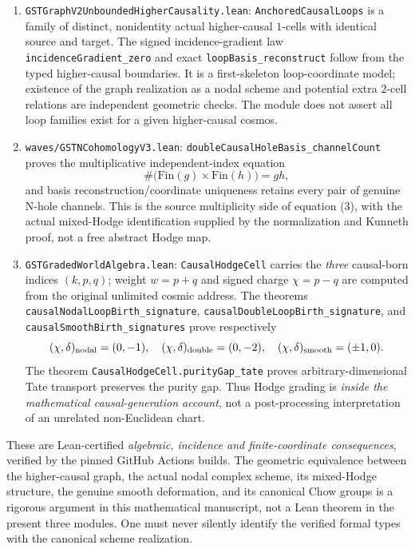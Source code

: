 \documentclass[11pt]{article}
\begin{document}
\begin{enumerate}
\item \texttt{GSTGraphV2UnboundedHigherCausality.lean}:
\texttt{AnchoredCausalLoops} is a family of distinct, nonidentity
actual higher-causal $1$-cells with identical source and target.
The signed incidence-gradient law
\texttt{incidenceGradient\_zero} and exact
\texttt{loopBasis\_reconstruct} follow from the typed
higher-causal boundaries. It is a first-skeleton loop-coordinate
model; existence of the graph realization as a nodal scheme and
potential extra $2$-cell relations are independent geometric
checks. The module does not assert all loop families exist
for a given higher-causal cosmos.

\item \texttt{waves/GSTNCohomologyV3.lean}:
\texttt{doubleCausalHoleBasis\_channelCount} proves the
multiplicative independent-index equation
\[
\#\bigl(\mathrm{Fin}(g)\times\mathrm{Fin}(h)\bigr)=gh,
\]
and basis reconstruction/coordinate uniqueness retains every
pair of genuine N-hole channels. This is the source multiplicity
side of equation (3), with the actual mixed-Hodge identification
supplied by the normalization and Kunneth proof, not a free
abstract Hodge map.

\item \texttt{GSTGradedWorldAlgebra.lean}:
\texttt{CausalHodgeCell} carries the \emph{three} causal-born
indices $(k,p,q)$; weight $w=p+q$ and signed charge $\chi=p-q$
are computed from the original unlimited cosmic address.
The theorems \texttt{causalNodalLoopBirth\_signature},
\texttt{causalDoubleLoopBirth\_signature}, and
\texttt{causalSmoothBirth\_signatures} prove respectively
\[
(\chi,\delta)_{\rm nodal}=(0,-1),\quad
(\chi,\delta)_{\rm double}=(0,-2),\quad
(\chi,\delta)_{\rm smooth}=(\pm1,0).
\]
The theorem \texttt{CausalHodgeCell.purityGap\_tate}
proves arbitrary-dimensional Tate transport preserves the
purity gap. Thus Hodge grading is \emph{inside the mathematical
causal-generation account}, not a post-processing interpretation
of an unrelated non-Euclidean chart.
\end{enumerate}

These are Lean-certified \emph{algebraic, incidence and
finite-coordinate consequences}, verified by the pinned
GitHub Actions builds. The geometric equivalence between
the higher-causal graph, the actual nodal complex scheme,
its mixed-Hodge structure, the genuine smooth deformation,
and its canonical Chow groups is a rigorous argument in
this mathematical manuscript, not a Lean theorem in the
present three modules. One must never silently identify
the verified formal types with the canonical scheme realization.
\end{document}

